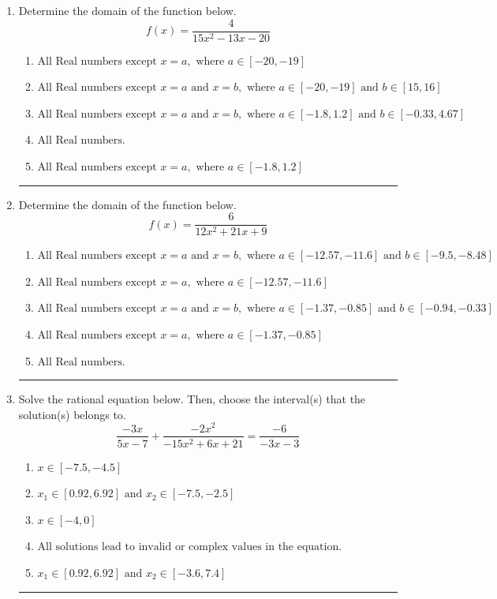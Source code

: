 \documentclass[14pt]{extbook}
\newcommand{\litem}[1]{\item#1\hspace*{-1cm}\rule{\textwidth}{0.4pt}}
\begin{document}
\begin{enumerate}
\litem{
Determine the domain of the function below.\[ f(x) = \frac{4}{15x^{2} -13 x -20} \]\begin{enumerate}[label=\Alph*.]
\item \( \text{All Real numbers except } x = a, \text{ where } a \in [-20, -19] \)
\item \( \text{All Real numbers except } x = a \text{ and } x = b, \text{ where } a \in [-20, -19] \text{ and } b \in [15, 16] \)
\item \( \text{All Real numbers except } x = a \text{ and } x = b, \text{ where } a \in [-1.8, 1.2] \text{ and } b \in [-0.33, 4.67] \)
\item \( \text{All Real numbers.} \)
\item \( \text{All Real numbers except } x = a, \text{ where } a \in [-1.8, 1.2] \)

\end{enumerate} }
\litem{
Determine the domain of the function below.\[ f(x) = \frac{6}{12x^{2} +21 x + 9} \]\begin{enumerate}[label=\Alph*.]
\item \( \text{All Real numbers except } x = a \text{ and } x = b, \text{ where } a \in [-12.57, -11.6] \text{ and } b \in [-9.5, -8.48] \)
\item \( \text{All Real numbers except } x = a, \text{ where } a \in [-12.57, -11.6] \)
\item \( \text{All Real numbers except } x = a \text{ and } x = b, \text{ where } a \in [-1.37, -0.85] \text{ and } b \in [-0.94, -0.33] \)
\item \( \text{All Real numbers except } x = a, \text{ where } a \in [-1.37, -0.85] \)
\item \( \text{All Real numbers.} \)

\end{enumerate} }
\litem{
Solve the rational equation below. Then, choose the interval(s) that the solution(s) belongs to.\[ \frac{-3x}{5x -7} + \frac{-2x^{2}}{-15x^{2} +6 x + 21} = \frac{-6}{-3x -3} \]\begin{enumerate}[label=\Alph*.]
\item \( x \in [-7.5,-4.5] \)
\item \( x_1 \in [0.92, 6.92] \text{ and } x_2 \in [-7.5,-2.5] \)
\item \( x \in [-4,0] \)
\item \( \text{All solutions lead to invalid or complex values in the equation.} \)
\item \( x_1 \in [0.92, 6.92] \text{ and } x_2 \in [-3.6,7.4] \)


\end{enumerate}}
\end{enumerate}
\end{document}
